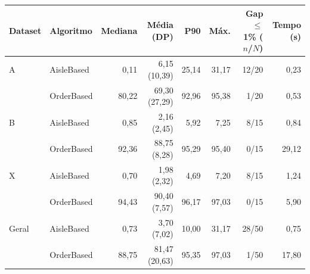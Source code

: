 \small
\begin{tabular}{llrrrrrr}
\toprule
Dataset & Algoritmo & Mediana & Média (DP) & P90 & Máx. & Gap $\leq$ 1\% ($n$/$N$) & Tempo (s) \\
\midrule
A & AisleBased & 0,11 & 6,15 (10,39) & 25,14 & 31,17 & 12/20 & 0,23 \\
 & OrderBased & 80,22 & 69,30 (27,29) & 92,96 & 95,38 & 1/20 & 0,53 \\
B & AisleBased & 0,85 & 2,16 (2,45) & 5,92 & 7,25 & 8/15 & 0,84 \\
 & OrderBased & 92,36 & 88,75 (8,28) & 95,29 & 95,40 & 0/15 & 29,12 \\
X & AisleBased & 0,70 & 1,98 (2,32) & 4,69 & 7,20 & 8/15 & 1,24 \\
 & OrderBased & 94,43 & 90,40 (7,57) & 96,17 & 97,03 & 0/15 & 5,90 \\
Geral & AisleBased & 0,73 & 3,70 (7,02) & 10,00 & 31,17 & 28/50 & 0,75 \\
 & OrderBased & 88,75 & 81,47 (20,63) & 95,35 & 97,03 & 1/50 & 17,80 \\
\bottomrule
\end{tabular}

